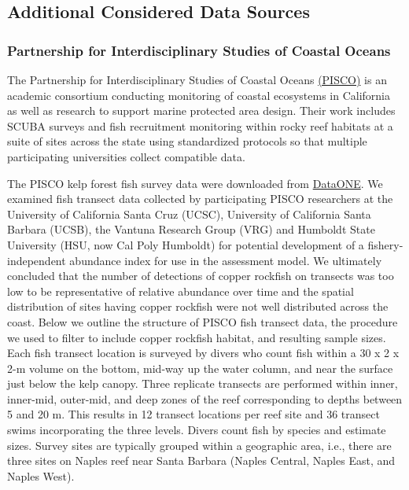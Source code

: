 \documentclass[11pt,
  english,
  letterpaper,
]{article}
\begin{document}
\hypertarget{additional-considered-data-sources}{%
\subsection{Additional Considered Data Sources}\label{additional-considered-data-sources}}

\hypertarget{partnership-for-interdisciplinary-studies-of-coastal-oceans}{%
\subsubsection{Partnership for Interdisciplinary Studies of Coastal Oceans}\label{partnership-for-interdisciplinary-studies-of-coastal-oceans}}

The Partnership for Interdisciplinary Studies of Coastal Oceans \href{https://www.piscoweb.org/}{(PISCO)} is an academic consortium conducting monitoring of coastal ecosystems in California as well as research to support marine protected area design. Their work includes SCUBA surveys and fish recruitment monitoring within rocky reef habitats at a suite of sites across the state using standardized protocols so that multiple participating universities collect compatible data.

The PISCO kelp forest fish survey data were downloaded from \href{https://www.dataone.org/}{DataONE}. We examined fish transect data collected by participating PISCO researchers at the University of California Santa Cruz (UCSC), University of California Santa Barbara (UCSB), the Vantuna Research Group (VRG) and Humboldt State University (HSU, now Cal Poly Humboldt) for potential development of a fishery-independent abundance index for use in the assessment model. We ultimately concluded that the number of detections of copper rockfish on transects was too low to be representative of relative abundance over time and the spatial distribution of sites having copper rockfish were not well distributed across the coast. Below we outline the structure of PISCO fish transect data, the procedure we used to filter to include copper rockfish habitat, and resulting sample sizes. Each fish transect location is surveyed by divers who count fish within a 30 x 2 x 2-m volume on the bottom, mid-way up the water column, and near the surface just below the kelp canopy. Three replicate transects are performed within inner, inner-mid, outer-mid, and deep zones of the reef corresponding to depths between 5 and 20 m. This results in 12 transect locations per reef site and 36 transect swims incorporating the three levels. Divers count fish by species and estimate sizes. Survey sites are typically grouped within a geographic area, i.e., there are three sites on Naples reef near Santa Barbara (Naples Central, Naples East, and Naples West).
\end{document}
